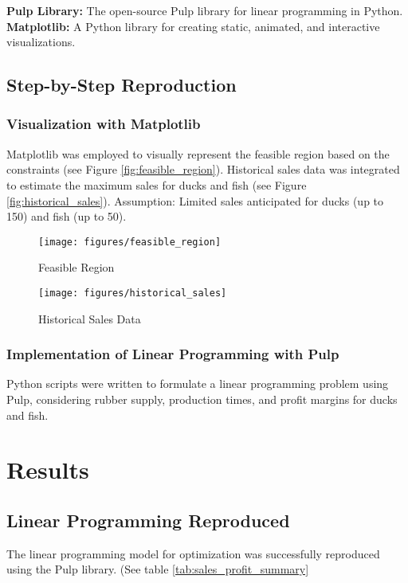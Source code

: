 \documentclass[sigconf, nonacm]{acmart}
\begin{document}
\textbf{Pulp Library:} The open-source Pulp library for linear programming in Python. \textbf{Matplotlib:} A Python library for creating static, animated, and interactive visualizations.

\subsection{Step-by-Step Reproduction}

\subsubsection{Visualization with Matplotlib}

Matplotlib was employed to visually represent the feasible region based on the constraints (see Figure \autoref{fig:feasible_region}). Historical sales data was integrated to estimate the maximum sales for ducks and fish (see Figure \autoref{fig:historical_sales}). Assumption: Limited sales anticipated for ducks (up to 150) and fish (up to 50).

\begin{figure}[htbp]
  \centering
  \texttt{[image: figures/feasible\_region]}
  \caption{Feasible Region}
  \label{fig:feasible_region}
\end{figure}

\begin{figure}[htbp]
  \centering
  \texttt{[image: figures/historical\_sales]}
  \caption{Historical Sales Data}
  \label{fig:historical_sales}
\end{figure}

\subsubsection{Implementation of Linear Programming with Pulp}

Python scripts were written to formulate a linear programming problem using Pulp, considering rubber supply, production times, and profit margins for ducks and fish.

\section{Results}

\subsection{Linear Programming Reproduced}
The linear programming model for optimization was successfully reproduced using the Pulp library. (See table \autoref{tab:sales_profit_summary}
\end{document}
